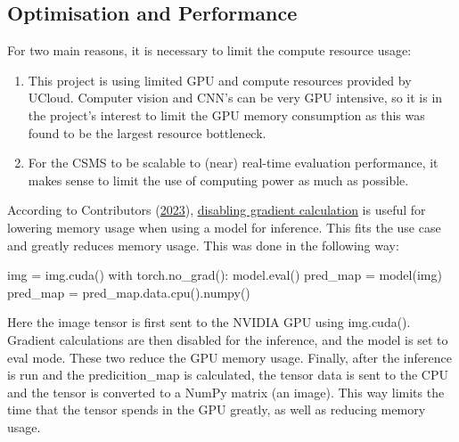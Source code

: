 \documentclass[
]{article}
\newenvironment{Shaded}{\begin{snugshade}}{\end{snugshade}}
\newcommand{\BuiltInTok}[1]{\textcolor[rgb]{0.00,0.23,0.31}{#1}}
\newcommand{\ControlFlowTok}[1]{\textcolor[rgb]{0.00,0.23,0.31}{#1}}
\newcommand{\NormalTok}[1]{\textcolor[rgb]{0.00,0.23,0.31}{#1}}
\newcommand{\OperatorTok}[1]{\textcolor[rgb]{0.37,0.37,0.37}{#1}}
\begin{document}
\hypertarget{optimisation-and-performance}{%
\subsection{Optimisation and
Performance}\label{optimisation-and-performance}}

For two main reasons, it is necessary to limit the compute resource
usage:

\begin{enumerate}
\def\labelenumi{\arabic{enumi}.}
\item
  This project is using limited GPU and compute resources provided by
  UCloud. Computer vision and CNN's can be very GPU intensive, so it is
  in the project's interest to limit the GPU memory consumption as this
  was found to be the largest resource bottleneck.
\item
  For the CSMS to be scalable to (near) real-time evaluation
  performance, it makes sense to limit the use of computing power as
  much as possible.
\end{enumerate}

According to Contributors (\protect\hyperlink{ref-pytorch}{2023}),
\href{https://pytorch.org/docs/stable/generated/torch.no_grad.html}{disabling
gradient calculation} is useful for lowering memory usage when using a
model for inference. This fits the use case and greatly reduces memory
usage. This was done in the following way:

\begin{Shaded}
\begin{Highlighting}[]
\NormalTok{img }\OperatorTok{=}\NormalTok{ img.cuda()}
\ControlFlowTok{with}\NormalTok{ torch.no\_grad():}
\NormalTok{  model.}\BuiltInTok{eval}\NormalTok{()}
\NormalTok{  pred\_map }\OperatorTok{=}\NormalTok{ model(img)}
\NormalTok{pred\_map }\OperatorTok{=}\NormalTok{ pred\_map.data.cpu().numpy()}
\end{Highlighting}
\end{Shaded}

Here the image tensor is first sent to the NVIDIA GPU using img.cuda().
Gradient calculations are then disabled for the inference, and the model
is set to eval mode. These two reduce the GPU memory usage. Finally,
after the inference is run and the predicition\_map is calculated, the
tensor data is sent to the CPU and the tensor is converted to a NumPy
matrix (an image). This way limits the time that the tensor spends in
the GPU greatly, as well as reducing memory usage.

\newpage{}
\end{document}

